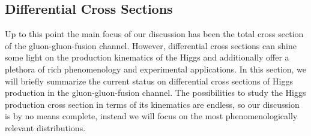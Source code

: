 \subsection{Differential Cross Sections} \label{subsec:4:differential_cross_sections}
Up to this point the main focus of our discussion has been the total cross section of the gluon-gluon-fusion channel. However, differential cross sections can shine some light on the production kinematics of the Higgs and additionally offer a plethora of rich phenomenology and experimental applications. In this section, we will briefly summarize the current status on differential cross sections of Higgs production in the gluon-gluon-fusion channel. The possibilities to study the Higgs production cross section in terms of its kinematics are endless, so our discussion is by no means complete, instead we will focus on the most phenomenologically relevant distributions.

